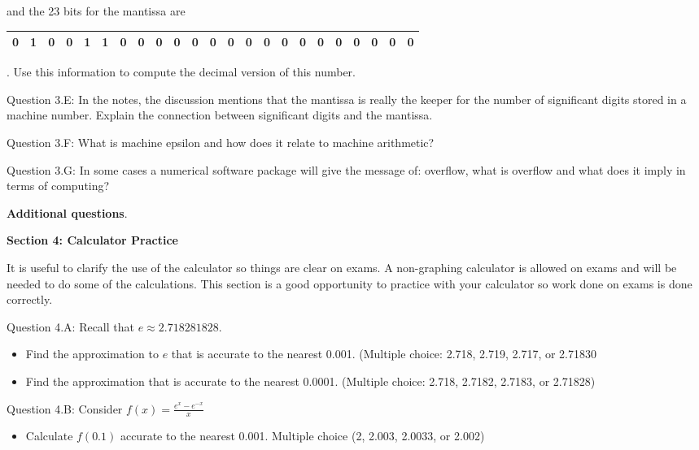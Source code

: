 \documentclass{article}
\def\ds{\displaystyle}
\begin{document}
and the 23 bits for the mantissa are \par \noindent
 \begin{tabular}{|c|c|c|c|c|c|c|c|c|c|c|c|c|c|c|c|c|c|c|c|c|c|c|}
\hline
0 & 1 & 0 & 0 & 1 & 1 & 0 & 0 & 0 & 0 &  0 & 0& 0  & 0 & 0 & 0 & 0 & 0 & 0 & 0 & 0 & 0 & 0\\
\hline
\end{tabular}. Use this information to compute the decimal version of this number. 
\medskip \par \noindent
%
Question 3.E: In the notes, the discussion mentions that the mantissa is really the keeper for the number of significant digits stored in a machine number. Explain the connection between significant digits and the mantissa. 
\medskip \par \noindent
%
Question 3.F: What is machine epsilon and how does it relate to machine arithmetic?
\medskip \par \noindent
%
Question 3.G: In some cases a numerical software package will give the message of: overflow, what is overflow and what does it imply in terms of computing?
%
\bigskip \par \noindent
%
{\bf Additional questions}. \medskip \par \noindent
{\bf Section 4: Calculator Practice}
\medskip \par \noindent
It is useful to clarify the use of the calculator so things are clear on exams. A non-graphing calculator is allowed on exams and will be needed to do some of the calculations. This section is a good opportunity to practice with your calculator so work done on exams is done correctly. \medskip \par \noindent
Question 4.A: Recall that $e \approx 2.718281828$. 
\begin{itemize}
    \item Find the approximation to $e$ that is accurate to the nearest 0.001. (Multiple choice: 2.718, 2.719, 2.717, or 2.71830
    \item Find the approximation that is accurate to the nearest 0.0001. (Multiple choice: 2.718, 2.7182, 2.7183, or 2.71828)
\end{itemize}
\medskip \par \noindent
Question 4.B: Consider $\ds f(x) =\frac {e^x - e^{-x}}x$
\begin{itemize}
    \item Calculate $f(0.1)$ accurate to the nearest 0.001. Multiple choice (2, 2.003, 2.0033, or 2.002)
\end{itemize} \medskip \par \noindent 
\end{document}
